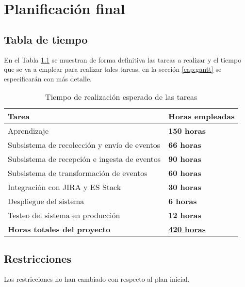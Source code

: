 \chapter{Planificación final}\label{cap:planificacion}


\section{Tabla de tiempo}
En el Tabla \ref{tabla:tiempotareas} se muestran de forma definitiva las tareas a realizar y el tiempo que se va a emplear para realizar tales tareas, en la sección \ref{cap:gantt} se especificarán con más detalle.

\begin{table}[H]\label{tabla:tiempotareas}
	\centering
	\begin{tabular}{|l|l|}
		\hline
		\textbf{Tarea}                               & \textbf{Horas empleadas}                  \\ \hline
		Aprendizaje                                  & \textbf{150 horas}                        \\ \hline
		Subsistema de recolección y envío de eventos & \textbf{66 horas}                         \\ \hline
		Subsistema de recepción e ingesta de eventos & \textbf{90 horas}                         \\ \hline
		Subsistema de transformación de eventos      & \textbf{60 horas}                         \\ \hline
		Integración con JIRA y ES Stack              & \textbf{30 horas}                         \\ \hline
		Despliegue del sistema                       & \textbf{6 horas}                          \\ \hline
		Testeo del sistema en producción             & \textbf{12 horas}                         \\ \hline
		\textbf{Horas totales del proyecto}          & \underline{\textbf{420 horas}}            \\ \hline
	\end{tabular}
	\caption{Tiempo de realización esperado de las tareas}
\end{table}

\section{Restricciones}
Las restricciones no han cambiado con respecto al plan inicial.

